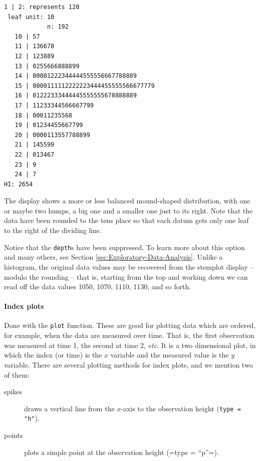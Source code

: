 \documentclass[captions=tableheading]{scrbook}
\begin{document}
\begin{verbatim}
1 | 2: represents 120
 leaf unit: 10
            n: 192
   10 | 57
   11 | 136678
   12 | 123889
   13 | 0255666888899
   14 | 00001222344444555556667788889
   15 | 0000111112222223444455555566677779
   16 | 01222333444445555555678888889
   17 | 11233344566667799
   18 | 00011235568
   19 | 01234455667799
   20 | 0000113557788899
   21 | 145599
   22 | 013467
   23 | 9
   24 | 7
HI: 2654
\end{verbatim}

The display shows a more or less balanced mound-shaped distribution, with one or maybe two humps, a big one and a smaller one just to its right. Note that the data have been rounded to the tens place so that each datum gets only one leaf to the right of the dividing line.

Notice that the \texttt{depth}s have been suppressed. To learn more about this option and many others, see Section \ref{sec:Exploratory-Data-Analysis}. Unlike a histogram, the original data values may be recovered from the stemplot display -- modulo the rounding -- that is, starting from the top and working down we can read off the data values 1050, 1070, 1110, 1130, and so forth. 

\paragraph*{Index plots}

Done with the \texttt{plot} function. These are good for plotting data which are ordered, for example, when the data are measured over time. That is, the first observation was measured at time 1, the second at time 2, \emph{etc}. It is a two dimensional plot, in which the index (or time) is the \(x\) variable and the measured value is the \(y\) variable. There are several plotting methods for index plots, and we mention two of them:

\begin{description}
\item[spikes] draws a vertical line from the \(x\)-axis to the observation height (\texttt{type = "h"}).
\item[points] plots a simple point at the observation height (=type = ``p''=).
\end{description}
\end{document}
